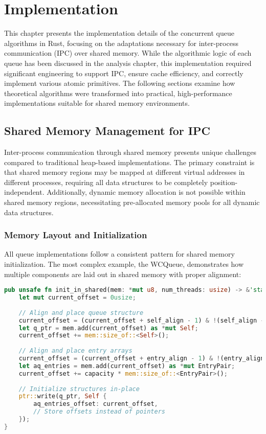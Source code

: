 \chapter{Implementation}

This chapter presents the implementation details of the concurrent queue algorithms in Rust, focusing on the adaptations necessary for inter-process communication (IPC) over shared memory. While the algorithmic logic of each queue has been discussed in the analysis chapter, this implementation required significant engineering to support IPC, ensure cache efficiency, and correctly implement various atomic primitives. The following sections examine how theoretical algorithms were transformed into practical, high-performance implementations suitable for shared memory environments.

\section{Shared Memory Management for IPC}

Inter-process communication through shared memory presents unique challenges compared to traditional heap-based implementations. The primary constraint is that shared memory regions may be mapped at different virtual addresses in different processes, requiring all data structures to be completely position-independent. Additionally, dynamic memory allocation is not possible within shared memory regions, necessitating pre-allocated memory pools for all dynamic data structures.

\subsection{Memory Layout and Initialization}

All queue implementations follow a consistent pattern for shared memory initialization. The most complex example, the WCQueue, demonstrates how multiple components are laid out in shared memory with proper alignment:

\begin{lstlisting}[language=Rust, style=boxed, caption={Memory layout initialization in WCQueue}, label={lst:wcqueue-init}]
pub unsafe fn init_in_shared(mem: *mut u8, num_threads: usize) -> &'static mut Self {
    let mut current_offset = 0usize;
    
    // Align and place queue structure
    current_offset = (current_offset + self_align - 1) & !(self_align - 1);
    let q_ptr = mem.add(current_offset) as *mut Self;
    current_offset += mem::size_of::<Self>();
    
    // Align and place entry arrays
    current_offset = (current_offset + entry_align - 1) & !(entry_align - 1);
    let aq_entries = mem.add(current_offset) as *mut EntryPair;
    current_offset += capacity * mem::size_of::<EntryPair>();
    
    // Initialize structures in-place
    ptr::write(q_ptr, Self {
        aq_entries_offset: current_offset,
        // Store offsets instead of pointers
    });
}
\end{lstlisting}

